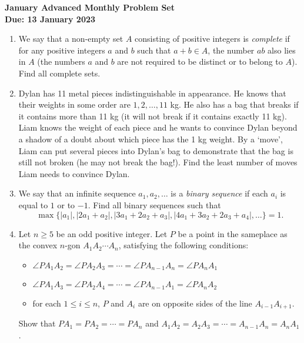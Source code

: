 \documentclass{article}
\newcommand{\abs}[1]{\left|#1\right|}
\begin{document}
\thispagestyle{empty}

\begin{center}
  \textbf{\Large January Advanced Monthly Problem Set}
  \\ \vspace{1em}
  \textbf{\large Due: 13 January 2023}
\end{center}

\bigskip

\begin{enumerate}[itemsep=\fill]

 
\item %
We say that a non-empty set $A$ consisting of positive integers is \textit{complete} if for any positive integers $a$ and $b$ such that $a+b\in A$, the number $ab$ also lies in $A$ (the numbers $a$ and $b$ are not required to be distinct or to belong to $A$). Find all complete sets.


\item %
Dylan has 11 metal pieces indistinguishable in appearance.
He knows that their weights in some order are $1,2,\dotsc,11$ kg.
He also has a bag that breaks if it contains more than 11 kg (it will not break if it contains exactly 11 kg).
Liam knows the weight of each piece and he wants to convince Dylan beyond a shadow of a doubt about which piece has the 1 kg weight.
By a `move', Liam can put several pieces into Dylan's bag to demonstrate that the bag is still not broken (he may not break the bag!).
Find the least number of moves Liam needs to convince Dylan.


\item %
We say that an infinite sequence $a_1, a_2, \dotsc$ is a \emph{binary sequence} if each $a_i$ is equal to $1$ or to $-1$.
Find all binary sequences such that \[ \max\{\abs{a_1}, \abs{2a_1+a_2}, \abs{3a_1+2a_2+a_3}, \abs{4a_1+3a_2+2a_3+a_4}, \dotsc\} = 1. \]


\item %
Let $n \geq 5$ be an odd positive integer.
Let $P$ be a point in the sameplace as the convex $n$-gon $A_1 A_2 \dotsm A_n$, satisfying the following conditions:
\begin{itemize}
	\item $\angle PA_1A_2 = \angle PA_2A_3 = \dotsb = \angle PA_{n-1}A_n = \angle PA_nA_1$
  \item $\angle PA_1A_3 =\angle PA_2A_4 = \dotsb = \angle PA_{n-1}A_1 = \angle PA_nA_2$
  \item for each $1\leq i\leq n$, $P$ and $A_i$ are on opposite sides of the line $A_{i-1}A_{i+1}$.
\end{itemize}
Show that $PA_1 = PA_2 = \dotsb = PA_n$ and $A_1A_2 = A_2A_3 = \dotsb = A_{n-1}A_n = A_nA_1$.



\end{enumerate}
\end{document}
